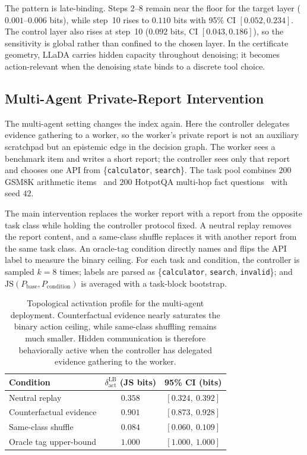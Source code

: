 \documentclass{article}
\begin{document}
The pattern is late-binding. Steps 2--8 remain near the floor for the target layer ($0.001$--$0.006$ bits), while step~10 rises to $0.110$ bits with 95\% CI $[0.052,0.234]$. The control layer also rises at step~10 ($0.092$ bits, CI $[0.043,0.186]$), so the sensitivity is global rather than confined to the chosen layer. In the certificate geometry, LLaDA carries hidden capacity throughout denoising; it becomes action-relevant when the denoising state binds to a discrete tool choice.

\subsection{Multi-Agent Private-Report Intervention}
\label{sec:multi-agent-private-report}

The multi-agent setting changes the index again. Here the controller delegates evidence gathering to a worker, so the worker's private report is not an auxiliary scratchpad but an epistemic edge in the decision graph. The worker sees a benchmark item and writes a short report; the controller sees only that report and chooses one API from \{\texttt{calculator}, \texttt{search}\}. The task pool combines $200$ GSM8K arithmetic items~\citep{cobbe2021training} and $200$ HotpotQA multi-hop fact questions~\citep{yang2018hotpotqa} with seed $42$.

The main intervention replaces the worker report with a report from the opposite task class while holding the controller protocol fixed. A neutral replay removes the report content, and a same-class shuffle replaces it with another report from the same task class. An oracle-tag condition directly names and flips the API label to measure the binary ceiling. For each task and condition, the controller is sampled $k{=}8$ times; labels are parsed as \{\texttt{calculator}, \texttt{search}, \texttt{invalid}\}; and $\mathrm{JS}(P_\text{base},P_\text{condition})$ is averaged with a task-block bootstrap.

\begin{table}[t]
\centering
\begin{tabular}{lcc}
\toprule
Condition & $\delta_\text{act}^\text{LB}$ (JS bits) & 95\% CI (bits) \\
\midrule
Neutral replay & $0.358$ & $[0.324,\ 0.392]$ \\
Counterfactual evidence & $0.901$ & $[0.873,\ 0.928]$ \\
Same-class shuffle & $0.084$ & $[0.060,\ 0.109]$ \\
Oracle tag upper-bound & $1.000$ & $[1.000,\ 1.000]$ \\
\bottomrule
\end{tabular}
\caption{Topological activation profile for the multi-agent deployment. Counterfactual evidence nearly saturates the binary action ceiling, while same-class shuffling remains much smaller. Hidden communication is therefore behaviorally active when the controller has delegated evidence gathering to the worker.}
\label{tab:multi-agent-dynamic}
\end{table}
\end{document}
